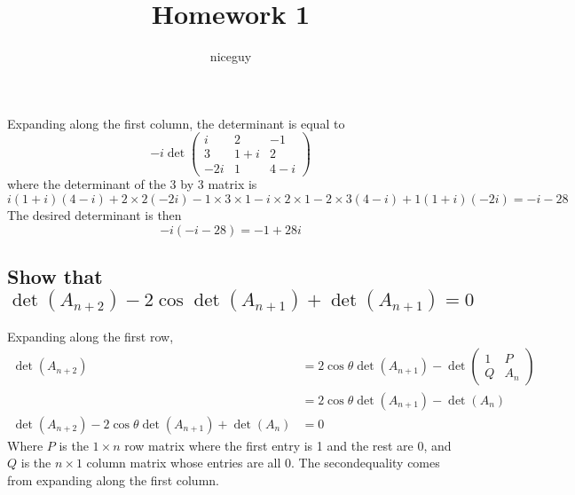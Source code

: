 \documentclass[answers]{exam}
\title{Homework 1}
\author{niceguy}
\begin{document}
\maketitle

\begin{questions}


\begin{solution}
	Expanding along the first column, the determinant is equal to
	$$-i\det\begin{pmatrix} i & 2 & -1 \\
		3 & 1+i & 2 \\
	-2i & 1 & 4-i\end{pmatrix}$$
	where the determinant of the 3 by 3 matrix is
	$$i(1+i)(4-i) + 2\times2(-2i) - 1\times3\times1 -i\times2\times1 - 2\times3(4-i) + 1(1+i)(-2i) = -i-28$$
	The desired determinant is then
	$$-i(-i-28) = -1+28i$$
\end{solution}


\begin{parts}
	\part{Show that $\det(A_{n+2}) - 2\cos\det(A_{n+1}) + \det(A_{n+1}) = 0$}\label{a}

	\begin{solution}
		Expanding along the first row,
		\begin{align*}
			\det(A_{n+2}) &= 2\cos\theta\det(A_{n+1}) - \det\begin{pmatrix} 1 & P \\ Q & A_n\end{pmatrix} \\
				      &= 2\cos\theta\det(A_{n+1}) - \det(A_n) \\
			\det(A_{n+2}) - 2\cos\theta\det(A_{n+1}) + \det(A_n) &= 0
		\end{align*}
		Where $P$ is the $1\times n$ row matrix where the first entry is 1 and the rest are 0, and $Q$ is the $n \times 1$ column matrix whose entries are all 0. The secondequality comes from expanding along the first column.
	\end{solution}


\end{parts}
\end{questions}
\end{document}
